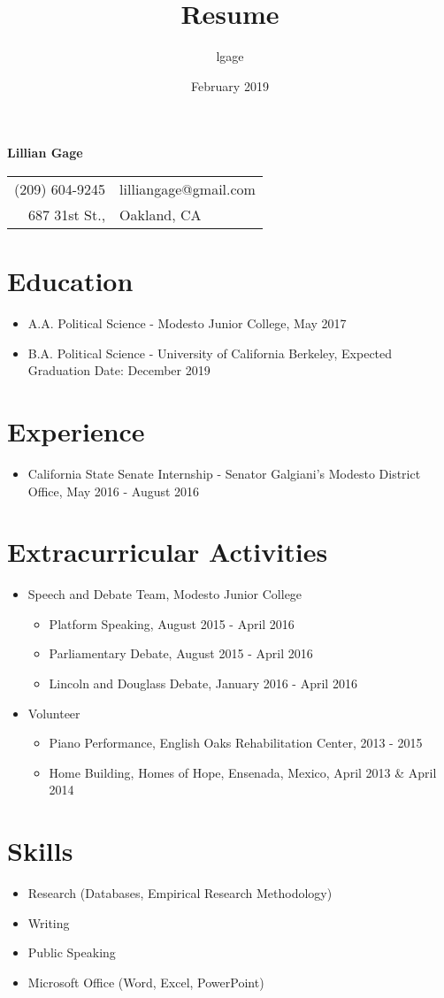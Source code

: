 \documentclass{article}
\title{Resume}
\author{lgage }
\date{February 2019}
\begin{document}
\thispagestyle{empty}

\begin{center}
\huge\textbf{Lillian Gage}
\end{center}

\begin{center}
\begin{tabular}{rl}
(209) 604-9245 & lilliangage@gmail.com\\
687 31st St., & Oakland, CA\end{tabular}
\end{center}

\section*{Education}
\begin{itemize}
    \item A.A. Political Science - Modesto Junior College, May 2017
    \item B.A. Political Science - University of California Berkeley, Expected Graduation Date: December 2019
\end{itemize}

\section*{Experience}
\begin{itemize}
    \item California State Senate Internship - Senator Galgiani's Modesto District Office, May 2016 - August 2016
\end{itemize}

\section*{Extracurricular Activities}
\begin{itemize}
\item Speech and Debate Team, Modesto Junior College
\begin{itemize}
\item Platform Speaking, August 2015 - April 2016
\item Parliamentary Debate, August 2015 - April 2016
\item Lincoln and Douglass Debate, January 2016 - April 2016
\end{itemize}
\item Volunteer
\begin{itemize}
\item Piano Performance, English Oaks Rehabilitation Center, 2013 - 2015
\item Home Building, Homes of Hope, Ensenada, Mexico, April 2013 \& April 2014
\end{itemize}
\end{itemize}

\section*{Skills}
\begin{itemize}
    \item Research (Databases, Empirical Research Methodology)
    \item Writing
    \item Public Speaking
    \item Microsoft Office (Word, Excel, PowerPoint)
\end{itemize}
\end{document}
